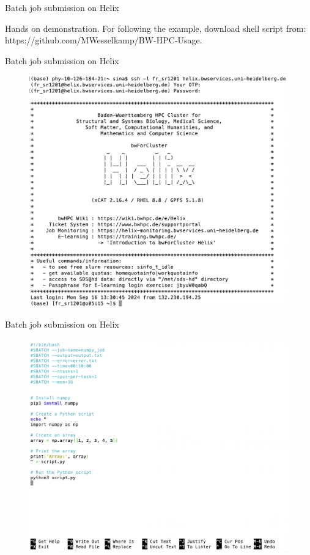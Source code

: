 \documentclass{beamer}
\begin{document}
\begin{frame}{Batch job submission on Helix}

Hands on demonstration. For following the example, download shell script from: https://github.com/MWesselkamp/BW-HPC-Usage.


\end{frame}


\begin{frame}{Batch job submission on Helix}

\begin{figure}
    \centering
    \includegraphics[width=0.85\linewidth]{examples/ScreenShots/S1.png}
\end{figure}

\end{frame}

\begin{frame}{Batch job submission on Helix}

\begin{figure}
    \centering
    \includegraphics[width=0.85\linewidth]{examples/ScreenShots/S2.png}
\end{figure}

\end{frame}
\end{document}
